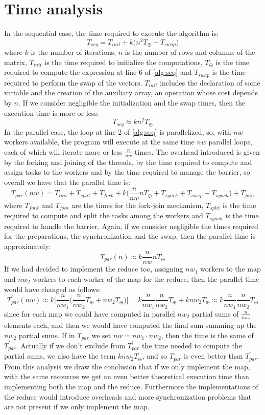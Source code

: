 \documentclass[12pt]{article}
\begin{document}
	\section{Time analysis}
	In the sequential case, the time required to execute the algorithm is:
	\[ T_{seq} = T_{init} + k\Big(n^2T_\oplus + T_{swap}\Big) \]
	where $k$ is the number of iterations, $n$ is the number of rows and columns of the matrix, $T_{init}$ is the time required to initialize the computations, $T_\oplus$ is the time required to compute the expression at line 6 of \ref{alg:seq} and $T_{swap}$ is the time required to perform the swap of the vectors. $T_{init}$ includes the declaration of some variable and the creation of the auxiliary array, an operation whose cost depends by $n$. If we consider negligible the initialization and the swap times, then the execution time is more or less: 
	\[ T_{seq} \approx kn^2T_\oplus \]
	In the parallel case, the loop at line 2 of \ref{alg:seq} is parallelized, so, with $nw$ workers available, the program will execute at the same time $nw$ parallel loops, each of which will iterate more or less $\frac{n}{nw}$ times. The overhead introduced is given by the forking and joining of the threads, by the time required to compute and assign tasks to the workers and by the time required to manage the barrier, so overall we have that the parallel time is:
	\[T_{par}(nw) = T_{init} + T_{split} + T_{fork} + k\Big(\frac{n}{nw}nT_\oplus + T_{synch} + T_{swap} + T_{synch}\Big) + T_{join} \]
	where $T_{fork}$ and $T_{join}$ are the times for the fork-join mechanism, $T_{split}$ is the time required to compute and split the tasks among the workers and $T_{synch}$ is the time required to handle the barrier. Again, if we consider negligible the times required for the preparations, the synchronization and the swap, then the parallel time is approximately:
	\[T_{par}(n) \approx k\frac{n}{nw}nT_\oplus \]
	If we had decided to implement the reduce too, assigning $nw_1$ workers to the map and $nw_2$ workers to each worker of the map for the reduce, then the parallel time would have changed as follows:
	\[ T^\prime_{par}(nw) \approx k\Big[\frac{n}{nw_1}\Big(\frac{n}{nw_2}T_\oplus + nw_2T_\oplus \Big) \Big] = k\frac{n}{nw_1}\frac{n}{nw_2}T_\oplus + knw_2T_\oplus \approx k\frac{n}{nw_1}\frac{n}{nw_2}T_\oplus \]
	since for each map we could have computed in parallel $nw_2$ partial sums of $\frac{n}{nw_2}$ elements each, and then we would have computed the final sum summing up the $nw_2$ partial sums. If in $T_{par}$ we set $nw = nw_1\cdot nw_2$, then the time is the same of $T^\prime_{par}$. Actually if we don't exclude from $T^\prime_{par}$ the time needed to compute the partial sums, we also have the term $k nw_2T_\oplus$, and so $T_{par}$ is even better than $T^\prime_{par}$. From this analysis we draw the conclusion that if we only implement the map, with the same resources we get an even better theoretical execution time than implementing both the map and the reduce. Furthermore the implementations of the reduce would introduce overheads and more synchronization problems that are not present if we only implement the map.\\
\end{document}
